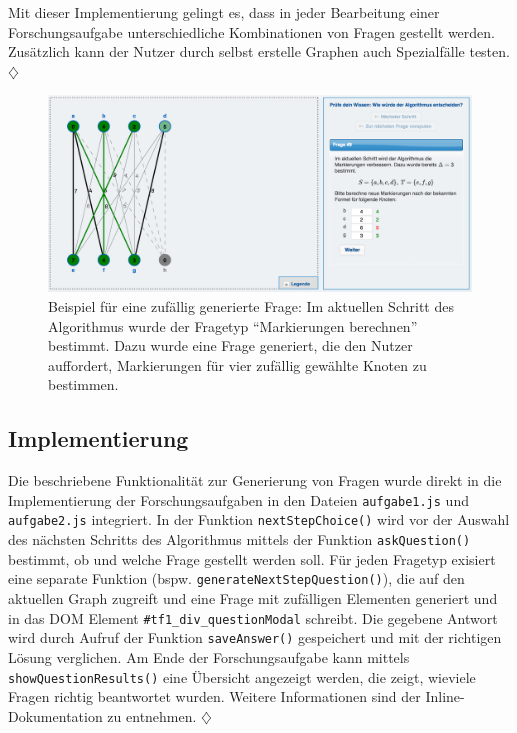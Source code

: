 Mit dieser Implementierung gelingt es, dass in jeder Bearbeitung einer Forschungsaufgabe unterschiedliche Kombinationen von Fragen gestellt werden. Zusätzlich kann der Nutzer durch selbst erstelle Graphen auch Spezialfälle testen. \hfill$\diamondsuit$

\begin{figure}[h!]
	\centering
	\includegraphics[width=\textwidth]{figures/random_question}
	\caption[Zufällig generierte Frage]{Beispiel für eine zufällig generierte Frage: Im aktuellen Schritt des Algorithmus wurde der Fragetyp \enquote{Markierungen berechnen} bestimmt. Dazu wurde eine Frage generiert, die den Nutzer auffordert, Markierungen für vier zufällig gewählte Knoten zu bestimmen.}\label{fig:random-question}
\end{figure}

\subsection*{Implementierung} %
Die beschriebene Funktionalität zur Generierung von Fragen wurde direkt in die Implementierung der Forschungsaufgaben in den Dateien \texttt{aufgabe1.js} und \texttt{aufgabe2.js} integriert. In der Funktion \texttt{nextStepChoice()} wird vor der Auswahl des nächsten Schritts des Algorithmus mittels der Funktion \texttt{askQuestion()} bestimmt, ob und welche Frage gestellt werden soll. Für jeden Fragetyp exisiert eine separate Funktion (bspw. \texttt{generateNextStepQuestion()}), die auf den aktuellen Graph zugreift und eine Frage mit zufälligen Elementen generiert und in das DOM Element \texttt{\#tf1\_div\_questionModal} schreibt. Die gegebene Antwort wird durch Aufruf der Funktion \texttt{saveAnswer()} gespeichert und mit der richtigen Lösung verglichen. Am Ende der Forschungsaufgabe kann mittels \texttt{showQuestionResults()} eine Übersicht angezeigt werden, die zeigt, wieviele Fragen richtig beantwortet wurden. Weitere Informationen sind der Inline-Dokumentation zu entnehmen. \hfill$\diamondsuit$

